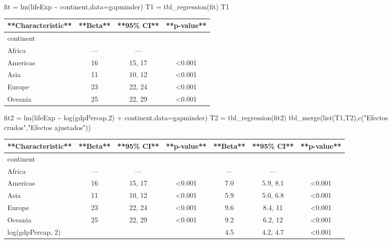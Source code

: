 \documentclass[
]{article}
\newenvironment{Shaded}{\begin{snugshade}}{\end{snugshade}}
\newcommand{\AttributeTok}[1]{\textcolor[rgb]{0.77,0.63,0.00}{#1}}
\newcommand{\DecValTok}[1]{\textcolor[rgb]{0.00,0.00,0.81}{#1}}
\newcommand{\FunctionTok}[1]{\textcolor[rgb]{0.00,0.00,0.00}{#1}}
\newcommand{\NormalTok}[1]{#1}
\newcommand{\OtherTok}[1]{\textcolor[rgb]{0.56,0.35,0.01}{#1}}
\newcommand{\SpecialCharTok}[1]{\textcolor[rgb]{0.00,0.00,0.00}{#1}}
\newcommand{\StringTok}[1]{\textcolor[rgb]{0.31,0.60,0.02}{#1}}
\numberwithin{ejcnt}{section}
\begin{document}
\begin{Shaded}
\begin{Highlighting}[]
\NormalTok{fit }\OtherTok{=} \FunctionTok{lm}\NormalTok{(lifeExp }\SpecialCharTok{\textasciitilde{}}\NormalTok{ continent,}\AttributeTok{data=}\NormalTok{gapminder)}
\NormalTok{T1 }\OtherTok{=} \FunctionTok{tbl\_regression}\NormalTok{(fit)}
\NormalTok{T1}
\end{Highlighting}
\end{Shaded}

\begin{tabular}{l|c|c|c}
\hline
**Characteristic** & **Beta** & **95\% CI** & **p-value**\\
\hline
continent &  &  & \\
\hline
Africa & — & — & \\
\hline
Americas & 16 & 15, 17 & <0.001\\
\hline
Asia & 11 & 10, 12 & <0.001\\
\hline
Europe & 23 & 22, 24 & <0.001\\
\hline
Oceania & 25 & 22, 29 & <0.001\\
\hline
\end{tabular}

\begin{Shaded}
\begin{Highlighting}[]
\NormalTok{fit2 }\OtherTok{=} \FunctionTok{lm}\NormalTok{(lifeExp }\SpecialCharTok{\textasciitilde{}} \FunctionTok{log}\NormalTok{(gdpPercap,}\DecValTok{2}\NormalTok{) }\SpecialCharTok{+}\NormalTok{ continent,}\AttributeTok{data=}\NormalTok{gapminder)}
\NormalTok{T2 }\OtherTok{=} \FunctionTok{tbl\_regression}\NormalTok{(fit2)}
\FunctionTok{tbl\_merge}\NormalTok{(}\FunctionTok{list}\NormalTok{(T1,T2),}\FunctionTok{c}\NormalTok{(}\StringTok{"Efectos crudos"}\NormalTok{,}\StringTok{"Efectos ajustados"}\NormalTok{))}
\end{Highlighting}
\end{Shaded}

\begin{tabular}{l|c|c|c|c|c|c}
\hline
**Characteristic** & **Beta** & **95\% CI** & **p-value** & **Beta** & **95\% CI** & **p-value**\\
\hline
continent &  &  &  &  &  & \\
\hline
Africa & — & — &  & — & — & \\
\hline
Americas & 16 & 15, 17 & <0.001 & 7.0 & 5.9, 8.1 & <0.001\\
\hline
Asia & 11 & 10, 12 & <0.001 & 5.9 & 5.0, 6.8 & <0.001\\
\hline
Europe & 23 & 22, 24 & <0.001 & 9.6 & 8.4, 11 & <0.001\\
\hline
Oceania & 25 & 22, 29 & <0.001 & 9.2 & 6.2, 12 & <0.001\\
\hline
log(gdpPercap, 2) &  &  &  & 4.5 & 4.2, 4.7 & <0.001\\
\hline
\end{tabular}
\end{document}
